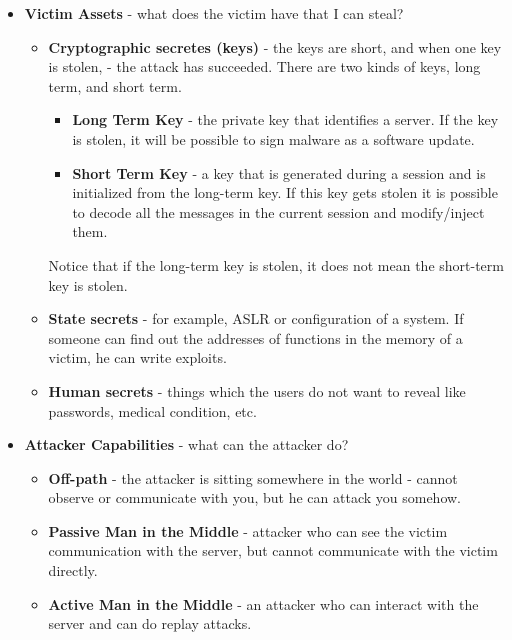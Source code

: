 \begin{itemize}
    \item \textbf{Victim Assets} - what does the victim have that I can steal? 
        \begin{itemize}
            \item \textbf{Cryptographic secretes (keys)} -  the keys are short,
            and when one key is stolen, - the attack has succeeded. There are
            two kinds of keys, long term, and short term.
                \begin{itemize}
                    \item \textbf{Long Term Key } - the private key that
                    identifies a server. If the key is stolen, it will be possible
                    to sign malware as a software update.
                    \item \textbf{Short Term Key} - a key that is generated during
                    a session and is initialized from the long-term key. If this key gets stolen  it is possible to decode all the messages in the current session and modify/inject them.
                \end{itemize}
                Notice that if the long-term key is stolen, it does not mean the short-term key is stolen.
            \item \textbf{State secrets} - for example, ASLR or configuration of
            a system. If someone can find out the addresses of functions in the
            memory of a victim, he can write exploits. 
            \item \textbf{Human secrets} - things which the users do not want to
            reveal like passwords, medical condition, etc.
        \end{itemize}
    \item \textbf{Attacker Capabilities} - what can the attacker do?
        \begin{itemize}
            \item \textbf{Off-path} - the attacker is sitting somewhere in the
            world - cannot observe or communicate with you, but he can attack you
            somehow. 
            \item \textbf{Passive Man in the Middle} - attacker who can see the
            victim communication with the server, but cannot communicate with the victim directly.
            \item \textbf{Active Man in the Middle} - an attacker who can
            interact with the server and can do replay attacks.

\end{itemize}
\end{itemize}
